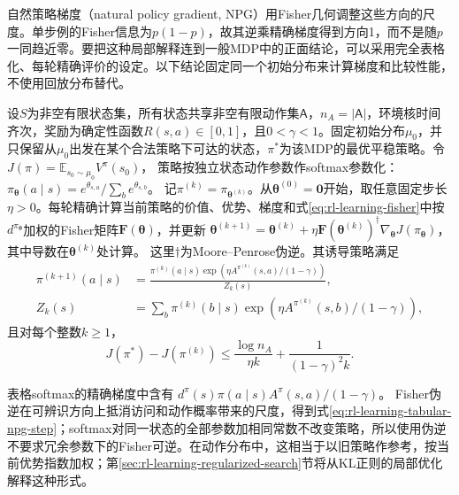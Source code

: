 自然策略梯度（natural policy gradient, NPG）用Fisher几何调整这些方向的尺度。单步例的Fisher信息为$p(1-p)$，故其逆乘精确梯度得到方向1，而不是随$p$一同趋近零。要把这种局部解释连到一般MDP中的正面结论，可以采用完全表格化、每轮精确评价的设定。以下结论固定同一个初始分布来计算梯度和比较性能，不使用回放分布替代。

\begin{theorem}[精确表格自然策略梯度的全局进展]
  \label{thm:rl-learning-tabular-npg}
  设$S$为非空有限状态集，所有状态共享非空有限动作集$\mathsf A$，$n_A=|\mathsf A|$，环境核时间齐次，奖励为确定性函数$R(s,a)\in[0,1]$，且$0<\gamma<1$。固定初始分布$\mu_0$，并只保留从$\mu_0$出发在某个合法策略下可达的状态，$\pi^*$为该MDP的最优平稳策略。令
  $J(\pi)=\mathbb E_{s_0\sim\mu_0}V^\pi(s_0)$，
  策略按独立状态动作参数作softmax参数化：
  $\pi_{\bm\theta}(a\mid s)=
  e^{\theta_{s,a}}/\sum_b e^{\theta_{s,b}}$。
  记$\pi^{(k)}=\pi_{\bm\theta^{(k)}}$。从$\bm\theta^{(0)}=\bm0$开始，取任意固定步长$\eta>0$。每轮精确计算当前策略的价值、优势、梯度和式\eqref{eq:rl-learning-fisher}中按$d^{\pi_{\bm\theta}}$加权的Fisher矩阵$\bm F(\bm\theta)$，并更新
  $\bm\theta^{(k+1)}=\bm\theta^{(k)}+
  \eta\bm F(\bm\theta^{(k)})^\dagger
          \nabla_{\bm\theta}J(\pi_{\bm\theta})$，其中导数在$\bm\theta^{(k)}$处计算。
  这里$\dagger$为Moore--Penrose伪逆。其诱导策略满足
  \begin{equation}
    \begin{aligned}
    \pi^{(k+1)}(a\mid s)&=
    \frac{\pi^{(k)}(a\mid s)
      \exp\!\left(\eta A^{\pi^{(k)}}(s,a)/(1-\gamma)\right)}
    {Z_k(s)},\\
    Z_k(s)&=\sum_b\pi^{(k)}(b\mid s)
      \exp\!\left(\eta A^{\pi^{(k)}}(s,b)/(1-\gamma)\right),
    \end{aligned}
    \label{eq:rl-learning-tabular-npg-step}
  \end{equation}
  且对每个整数$k\geq1$，
  \begin{equation}
    J(\pi^*)-J(\pi^{(k)})
       \leq\frac{\log n_A}{\eta k}
            +\frac{1}{(1-\gamma)^2k}.
    \label{eq:rl-learning-tabular-npg-rate}
  \end{equation}
\end{theorem}

表格softmax的精确梯度中含有
$d^\pi(s)\pi(a\mid s)A^\pi(s,a)/(1-\gamma)$。
Fisher伪逆在可辨识方向上抵消访问和动作概率带来的尺度，得到式\eqref{eq:rl-learning-tabular-npg-step}；softmax对同一状态的全部参数加相同常数不改变策略，所以使用伪逆不要求冗余参数下的Fisher可逆。在动作分布中，这相当于以旧策略作参考，按当前优势指数加权；第\ref{sec:rl-learning-regularized-search}节将从KL正则的局部优化解释这种形式。

